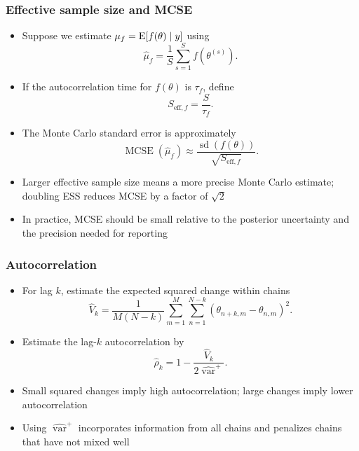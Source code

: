 \documentclass[10pt]{beamer}
\begin{document}
\begin{frame}

\frametitle{Effective sample size and MCSE}

  \begin{itemize}
  \item Suppose we estimate $\mu_f=\mathrm{E}[f(\theta)\mid y]$ using
    \[
      \widehat\mu_f=\frac{1}{S}\sum_{s=1}^S f(\theta^{(s)}).
    \]
  \pause
  \item If the autocorrelation time for $f(\theta)$ is $\tau_f$, define
    \[
      S_{\mathrm{eff},f}=\frac{S}{\tau_f}.
    \]
  \pause
  \item The Monte Carlo standard error is approximately
    \[
      \operatorname{MCSE}(\widehat\mu_f)
      \approx \frac{\operatorname{sd}(f(\theta))}
      {\sqrt{S_{\mathrm{eff},f}}}.
    \]
  \item<4-> Larger effective sample size means a more precise Monte Carlo
    estimate; doubling ESS reduces MCSE by a factor of $\sqrt{2}$
  \item<5-> In practice, MCSE should be small relative to the posterior
    uncertainty and the precision needed for reporting
  \end{itemize}
\end{frame}

\begin{frame}

\frametitle{Autocorrelation}

  \begin{itemize}
  \item For lag $k$, estimate the expected squared change within chains
    \begin{equation*}
      \widehat V_k=\frac{1}{M(N-k)}
      \sum_{m=1}^M\sum_{n=1}^{N-k}
      \left(\theta_{n+k,m}-\theta_{n,m}\right)^2.
    \end{equation*}
  \pause
  \item Estimate the lag-$k$ autocorrelation by
    \begin{equation*}
      \widehat\rho_k
      =1-\frac{\widehat V_k}{2\widehat{\operatorname{var}}^{+}}.
    \end{equation*}
  \item<3-> Small squared changes imply high autocorrelation; large changes
    imply lower autocorrelation
  \item<4-> Using $\widehat{\operatorname{var}}^{+}$ incorporates information
    from all chains and penalizes chains that have not mixed well
 \end{itemize}
\end{frame}
\end{document}
